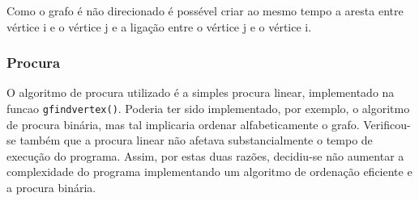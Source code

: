\documentclass[portuguese, a4paper]{article}
\newcommand\tu[0]{\textunderscore}
\begin{document}
	\par
	Como o grafo é não direcionado é possével criar ao mesmo tempo a aresta
	entre vértice i e o vértice j e a ligação entre o vértice j e o vértice i.
	\subsubsection{Procura}
	\par
	O algoritmo de procura utilizado é a simples procura linear, implementado
	na funcao \texttt{g\tu find\tu vertex()}. Poderia ter sido implementado,
	por exemplo, o algoritmo de procura binária, mas tal implicaria ordenar
	alfabeticamente o grafo. Verificou-se também que a procura linear não
	afetava substancialmente o tempo de execução do programa. Assim, por estas
	duas razões, decidiu-se não aumentar a complexidade do programa
	implementando um algoritmo de ordenação eficiente e a procura binária.
\end{document}
